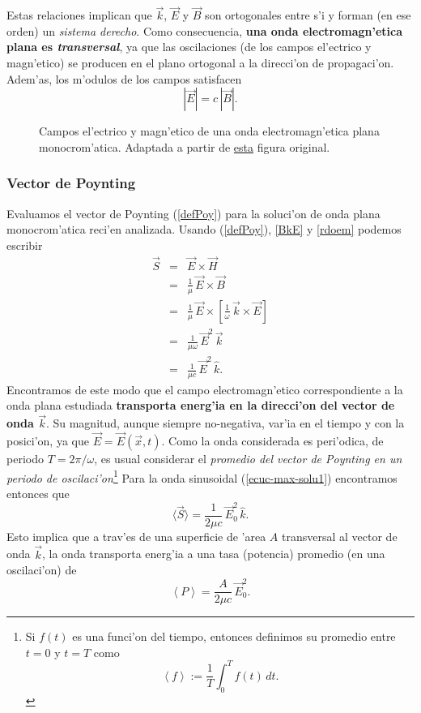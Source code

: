 Estas relaciones implican que $\vec{k}$, $\vec{E}$ y $\vec{B}$ son ortogonales
entre s'i y forman (en ese orden) un \textit{sistema derecho}. Como consecuencia, \textbf{una onda electromagn'etica plana es \textit{transversal}}, ya que las oscilaciones (de los campos el'ectrico y magn'etico) se producen en el plano ortogonal a la direcci'on de propagaci'on. Adem'as, los m'odulos de los campos satisfacen
\begin{equation}
 | \vec{E}|=c\,| \vec{B}| .
\end{equation}
\begin{figure}[!h]
\centerline{}
\caption{Campos el'ectrico y magn'etico de una onda electromagn'etica plana monocrom'atica. Adaptada a partir de \href{http://commons.wikimedia.org/wiki/File:Onde_electromagnetique.svg}{esta} figura original.}
\label{ondaem}
\end{figure}

\subsubsection{Vector de Poynting}
Evaluamos el vector de Poynting (\ref{defPoy}) para la soluci'on de onda plana monocrom'atica reci'en analizada. Usando (\ref{defPoy}), \eqref{BkE} y \eqref{rdoem} podemos escribir
\begin{eqnarray}
 \vec{S}&=&\vec{E}\times\vec{H} \\
&=&\frac{1}{\mu}\,\vec{E}\times\vec{B} \\
&=&\frac{1}{\mu}\,\vec{E}\times\left[\frac{1}{\omega}\,\vec{k}\times\vec{E}
\right] \\
&=&\frac{1}{\mu\omega}\,\vec{E}^2\,\vec{k}\\
&=&\frac{1}{\mu c}\,\vec{E}^2\,\hat{k}. \label{Sop}
\end{eqnarray}
Encontramos de este modo que el campo electromagn'etico correspondiente a la onda plana estudiada \textbf{transporta energ'ia en la direcci'on del vector de onda $\vec{k}$}. Su magnitud, aunque siempre no-negativa, var'ia en el tiempo y con la posici'on, ya que $\vec{E}=\vec{E}(\vec{x},t)$. Como la onda considerada es peri'odica, de periodo $T=2\pi/\omega$, es usual considerar el \textit{promedio del vector de Poynting en un periodo de oscilaci'on}\footnote{Si $f(t)$ es una funci'on del tiempo, entonces definimos su promedio entre $t=0$ y $t=T$ como 
\begin{equation}
\left<f\right>:=\frac{1}{T}\int_0^Tf(t)\,dt.
\end{equation}}
Para la onda sinusoidal (\ref{ecuc-max-solu1}) encontramos entonces que
\begin{equation}\label{Sprom}
\langle\vec{S}\rangle=\frac{1}{2\mu c}\,\vec{E}_0^2\,\hat{k}.
\end{equation}
Esto implica que a trav'es de una superficie de 'area $A$ transversal al vector de onda $\vec{k}$, la onda transporta energ'ia a una tasa (potencia) promedio (en una oscilaci'on) de 
\begin{equation}
 \left<P\right>=\frac{A}{2\mu c}\,\vec{E}_0^2.
\end{equation}

